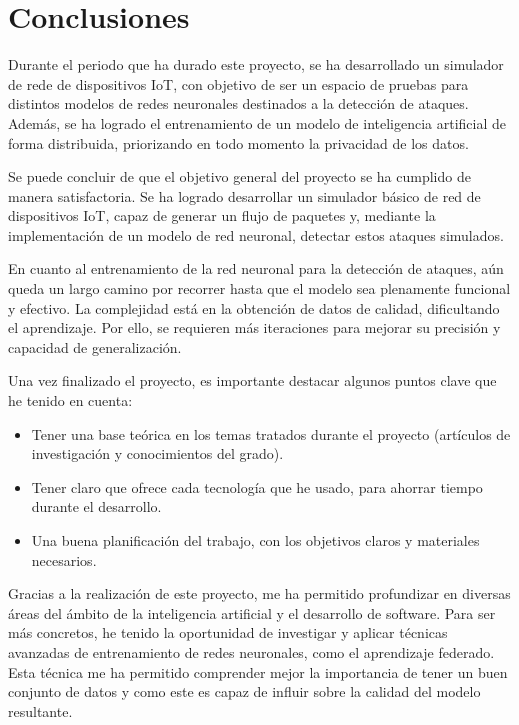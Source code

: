 
\section{Conclusiones}
\label{sec:conclusiones}
Durante el periodo que ha durado este proyecto, se ha desarrollado un simulador de rede de dispositivos IoT, con objetivo de ser un espacio de pruebas para distintos modelos de redes neuronales destinados a la detección de ataques. Además, se ha logrado el entrenamiento de un modelo de inteligencia artificial de forma distribuida, priorizando en todo momento la privacidad de los datos.

Se puede concluir de que el objetivo general del proyecto se ha cumplido de manera satisfactoria. Se ha logrado desarrollar un simulador básico de red de dispositivos IoT, capaz de generar un flujo de paquetes y, mediante la implementación de un modelo de red neuronal, detectar estos ataques simulados. 

En cuanto al entrenamiento de la red neuronal para la detección de ataques, aún queda un largo camino por recorrer hasta que el modelo sea plenamente funcional y efectivo. La complejidad está en la obtención de datos de calidad, dificultando el aprendizaje. Por ello, se requieren más iteraciones para mejorar su precisión y capacidad de generalización.

Una vez finalizado el proyecto, es importante destacar algunos puntos clave que he tenido en cuenta:
\begin{itemize}
    \item Tener una base teórica en los temas tratados durante el proyecto (artículos de investigación y conocimientos del grado).
    \item Tener claro que ofrece cada tecnología que he usado, para ahorrar tiempo durante el desarrollo.
    \item Una buena planificación del trabajo, con los objetivos claros y materiales necesarios.
\end{itemize}

Gracias a la realización de este proyecto, me ha permitido profundizar en diversas áreas del ámbito de la inteligencia artificial y el desarrollo de software. Para ser más concretos, he tenido la oportunidad de investigar y aplicar técnicas avanzadas de entrenamiento de redes neuronales, como el aprendizaje federado. Esta técnica me ha permitido comprender mejor la importancia de tener un buen conjunto de datos y como este es capaz de influir sobre la calidad del modelo resultante.


